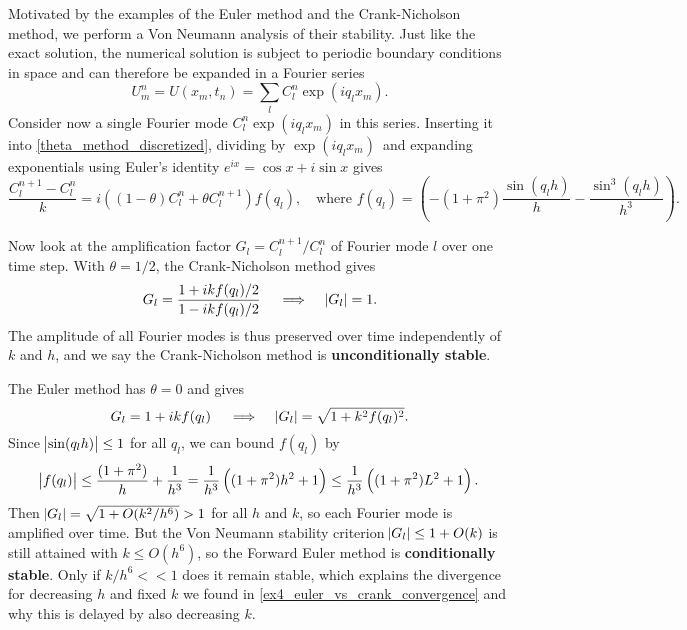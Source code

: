 Motivated by the examples of the Euler method and the Crank-Nicholson method, we perform a Von Neumann analysis of their stability.
Just like the exact solution, the numerical solution is subject to periodic boundary conditions in space and can therefore be expanded in a Fourier series \cite{Kreyszig}
\begin{equation}
	U_m^n = U(x_m, t_n) = \sum_l C_l^n \exp \left(i q_l x_m\right).
\end{equation}
Consider now a single Fourier mode $C_l^n \exp (i q_l x_m)$ in this series.
Inserting it into \cref{theta_method_discretized}, dividing by $\exp(i q_l x_m)$ and expanding exponentials using Euler's identity $e^{ix} = \cos x + i \sin x$ gives
\begin{equation*}
\frac{C_l^{n+1}-C_l^n}{k} = i \left(\left(1-\theta\right)C_l^n+\theta C_l^{n+1}\right) f(q_l) , \quad \text{where} \,\, f(q_l) = \left(-\left(1+\pi^2\right) \frac{\sin(q_l h)}{h} - \frac{\sin^3(q_l h)}{h^3}\right).
\end{equation*}

Now look at the amplification factor $G_l = C_l^{n+1} / C_l^n$ of Fourier mode $l$ over one time step. 
With $\theta = 1/2$, the Crank-Nicholson method gives 
\begin{equation}
	G_l = \frac{1 + i k f(q_l) / 2}{1 - i k f(q_l) / 2} \quad \implies \quad \abs{G_l} = 1.
	\label{crank_nicholson_amplification_factor}
\end{equation}
The amplitude of all Fourier modes is thus preserved over time independently of $k$ and $h$, and we say the Crank-Nicholson method is \textbf{unconditionally stable}.

The Euler method has $\theta = 0$ and gives
\begin{equation}
	G_l = 1 + i k f(q_l) \quad \implies \quad \abs{G_l} = \sqrt{1 + k^2 f(q_l)^2}.
	\label{euler_amplification_factor}
\end{equation}
Since $\abs{\sin(q_l h)} \leq 1$ for all $q_l$, we can bound $f(q_l)$ by
\begin{equation*}
	\abs{f(q_l)} \leq \frac{(1+\pi^2)}{h} + \frac{1}{h^3} = \frac{1}{h^3} \left( (1+\pi^2) h^2 + 1 \right) \leq \frac{1}{h^3} \left( (1+\pi^2) L^2 + 1 \right).
\end{equation*}
Then $\abs{G_l} = \sqrt{1 + O(k^2 / h^6)} > 1$ for all $h$ and $k$, so each Fourier mode is amplified over time.
But the Von Neumann stability criterion $\abs{G_l} \leq 1 + O(k)$ \cite{owren} is still attained with $k \leq O(h^6)$, so the Forward Euler method is \textbf{conditionally stable}.
Only if $k/h^6 << 1$ does it remain stable, which explains the divergence for decreasing $h$ and fixed $k$ we found in \cref{ex4_euler_vs_crank_convergence} and why this is delayed by also decreasing $k$.

